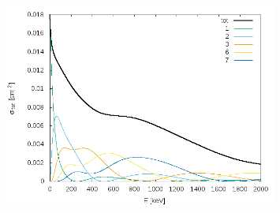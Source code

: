 \documentclass[11pt]{article}
\begin{document}
\begin{figure} 
\centering
\includegraphics[width=0.8\textwidth]{S+.png}
\caption{}\label{fig:1}
\end{figure}
\end{document}
